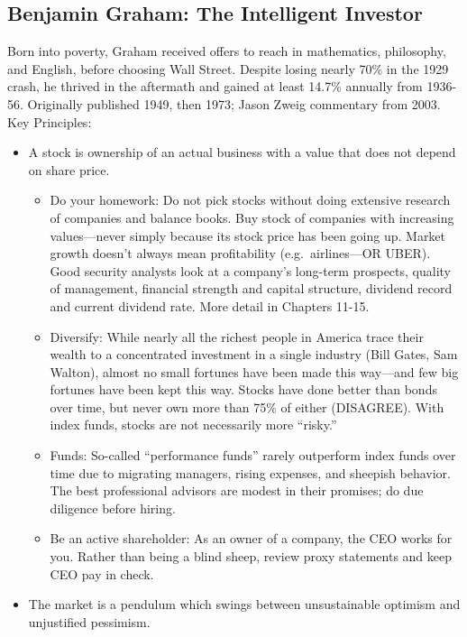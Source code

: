 \documentclass[
]{article}
\begin{document}
\hypertarget{benjamin-graham-the-intelligent-investor}{%
\subsection{Benjamin Graham: The Intelligent
Investor}\label{benjamin-graham-the-intelligent-investor}}

Born into poverty, Graham received offers to reach in mathematics,
philosophy, and English, before choosing Wall Street. Despite losing
nearly 70\% in the 1929 crash, he thrived in the aftermath and gained at
least 14.7\% annually from 1936-56. Originally published 1949, then
1973; Jason Zweig commentary from 2003. Key Principles:

\begin{itemize}
\item
  A stock is ownership of an actual business with a value that does not
  depend on share price.

  \begin{itemize}
  \item
    Do your homework: Do not pick stocks without doing extensive
    research of companies and balance books. Buy stock of companies with
    increasing values---never simply because its stock price has been
    going up. Market growth doesn't always mean profitability
    (e.g.~airlines---OR UBER). Good security analysts look at a
    company's long-term prospects, quality of management, financial
    strength and capital structure, dividend record and current dividend
    rate. More detail in Chapters 11-15.
  \item
    Diversify: While nearly all the richest people in America trace
    their wealth to a concentrated investment in a single industry (Bill
    Gates, Sam Walton), almost no small fortunes have been made this
    way---and few big fortunes have been kept this way. Stocks have done
    better than bonds over time, but never own more than 75\% of either
    (DISAGREE). With index funds, stocks are not necessarily more
    ``risky.''
  \item
    Funds: So-called ``performance funds'' rarely outperform index funds
    over time due to migrating managers, rising expenses, and sheepish
    behavior. The best professional advisors are modest in their
    promises; do due diligence before hiring.
  \item
    Be an active shareholder: As an owner of a company, the CEO works
    for you. Rather than being a blind sheep, review proxy statements
    and keep CEO pay in check.
  \end{itemize}
\item
  The market is a pendulum which swings between unsustainable optimism
  and unjustified pessimism.


\end{itemize}
\end{document}
